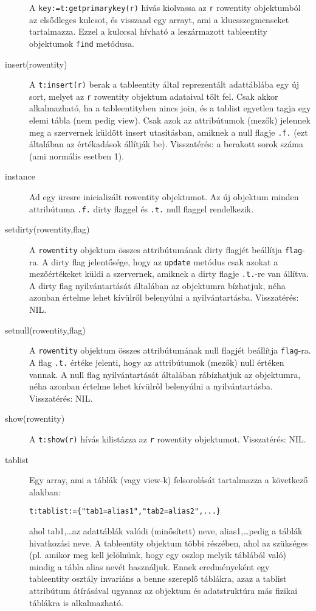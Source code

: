 \begin{description}
    A \verb!key:=t:getprimarykey(r)! hívás kiolvassa 
    az \verb!r! rowentity objektumból az elsődleges kulcsot, 
    és visszaad  egy arrayt, ami a klucsszegmenseket tartalmazza. 
    Ezzel a kulccsal hívható a leszármazott tableentity objektumok 
    \verb!find! metódusa.
\item[insert(rowentity)]
    A \verb!t:insert(r)! berak a tableentity által reprezentált
    adattáblába egy új sort, melyet
    az \verb!r! rowentity objektum adataival tölt fel.
    Csak akkor alkalmazható, ha a tableentityben nincs join,
    és a tablist egyetlen tagja egy elemi tábla (nem pedig view).
    Csak azok az attribútumok (mezők) jelennek meg a szervernek küldött
    insert utasításban, amiknek a null flagje \verb!.f.! 
    (ezt általában az értékadások állítják be).
    Visszatérés: a berakott sorok száma (ami normális esetben 1).
\item[instance]
    Ad egy üresre inicializált rowentity objektumot.
    Az új objektum minden attribútuma \verb!.f.! dirty flaggel
    és \verb!.t.! null flaggel rendelkezik.
\item[setdirty(rowentity,flag)]
    A \verb!rowentity! objektum összes attribútumának dirty flagjét 
    beállítja \verb!flag!-ra.
    A dirty flag jelentősége, hogy az \verb!update!
    metódus csak azokat a mezőértékeket küldi a szervernek,
    amiknek a dirty flagje \verb!.t.!-re van állítva. 
    A dirty flag nyilvántartását általában az objektumra bízhatjuk, 
    néha azonban értelme lehet kívülről belenyúlni a nyilvántartásba. 
    Visszatérés: NIL.
\item[setnull(rowentity,flag)]
    A \verb!rowentity! objektum összes attribútumának null flagjét 
    beállítja \verb!flag!-ra. A flag \verb!.t.! értéke jelenti,
    hogy az attribútumok (mezők) null értéken vannak.
    A null flag nyilvántartását általában rábízhatjuk az objektumra, 
    néha azonban értelme lehet kívülről belenyúlni a nyilvántartásba. 
    Visszatérés: NIL.
\item[show(rowentity)]
    A \verb!t:show(r)! hívás kilistázza az \verb!r! rowentity objektumot.
    Visszatérés: NIL.
\item[tablist]
    Egy array, ami a táblák (vagy view-k) felsorolását
    tartalmazza a következő alakban:
\begin{verbatim}
t:tablist:={"tab1=alias1","tab2=alias2",...}
\end{verbatim}
    ahol 
    tab1,\ldots az adattáblák valódi (minősített) neve,
    alias1,\ldots pedig a táblák hivatkozási neve.
    A tableentity objektum többi részében, ahol az szükséges
    (pl. amikor meg kell jelölnünk, hogy egy oszlop melyik táblából való)
    mindig a tábla alias nevét használjuk. Ennek eredményeként
    egy tableentity osztály invariáns a benne szereplő táblákra,
    azaz a tablist attribútum átírásával ugyanaz az objektum
    és adatstruktúra más fizikai táblákra is alkalmazható.
    

\end{description}
